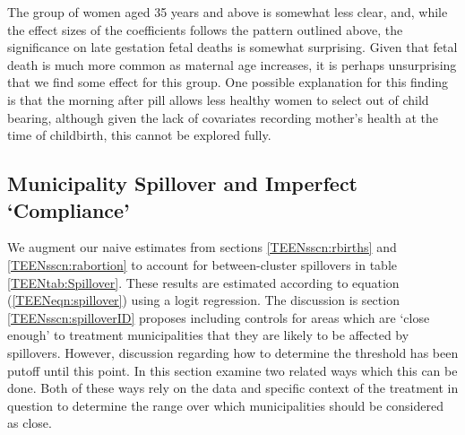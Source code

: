 The group of women aged 35 years and above is somewhat less clear, and, while the 
effect sizes of the coefficients follows the pattern outlined above, the
significance on late gestation fetal deaths is somewhat surprising.  Given that
fetal death is much more common as maternal age increases, it is perhaps 
unsurprising that we find some effect for this group.  One possible explanation
for this finding is that the morning after pill allows less healthy women to 
select out of child bearing, although given the lack of covariates recording 
mother's health at the time of childbirth, this cannot be explored fully.

\subsection{Municipality Spillover and Imperfect `Compliance'}
\label{TEENsscn:spillover}
We augment our naive estimates from sections \ref{TEENsscn:rbirths} and
\ref{TEENsscn:rabortion} to account for between-cluster spillovers in table
\ref{TEENtab:Spillover}.  These results are estimated according to equation
(\ref{TEENeqn:spillover}) using a logit regression.  The discussion is section
\ref{TEENsscn:spilloverID} proposes including controls for areas which are `close 
enough' to treatment municipalities that they are likely to be affected by
spillovers.  However, discussion regarding how to determine the threshold has
been putoff until this point. In this section \person examine two related ways 
which this can be done.  Both of these ways rely on the data and specific context 
of the treatment in question to determine the range over which municipalities 
should be considered as close.

